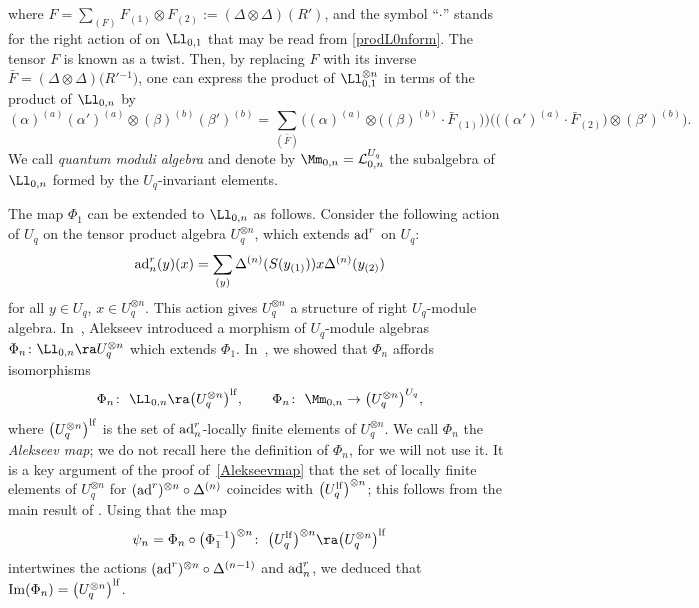 where $F=\sum_{(F)} F_{(1)}\otimes F_{(2)} := (\Delta \otimes \Delta)(R')$, and the symbol ``$\cdot$'' stands for the right action of  on $\Ll_{0,1}$ that may be read from \eqref{prodL0nform}. The tensor $F$ is known as a twist. Then, by replacing $F$ with its inverse $\bar{F} = (\Delta \otimes \Delta)\big(R'{}^{-1}\big)$, one can express the product of
$\Ll_{0,1}^{\otimes n}$ in terms of the product of $\Ll_{0,n}$ by
\begin{equation}\label{prodL0nform3}
(\alpha)^{(a)}(\alpha')^{(a)}\otimes (\beta)^{(b)}(\beta')^{(b)} = \sum_{(\bar{F})}\big((\alpha)^{(a)}\otimes
 \big((\beta)^{(b)}\cdot \bar{F}_{(1)}\big)\big) \big( \big((\alpha')^{(a)}\cdot \bar{F}_{(2)}\big)\otimes (\beta')^{(b)}\big).
\end{equation}
 We call {\it quantum moduli algebra} and denote by $\Mm_{0,n} = {\mathcal L}_{0,n}^{U_q}$ the subalgebra of $\Ll_{0,n}$ formed by the $U_q$-invariant elements.


The map $\Phi_1$ can be extended to $\Ll_{0,n}$ as follows. Consider the following action of $U_q$ on the tensor product algebra $U_q^{{\otimes} n}$, which extends ${\rm ad}^r$ on $U_q$:
\[%
{\rm ad}_n^r(y)(x) = \sum_{(y)}\Delta^{(n)}({S}(y_{(1)})) x \Delta^{(n)}(y_{(2)})
\]
for all $y \in U_q$, $x \in U_q^{{\otimes} n}$. This action gives $U_q^{{\otimes} n}$ a structure of right $U_q$-module algebra. In~\cite{A}, Alekseev introduced a morphism of $U_q$-module algebras $\Phi_n\colon \Ll_{0,n} \ra U_q^{\otimes n}$ which extends $\Phi_1$. In~\cite[Proposition~6.7]{BR}, we showed that $\Phi_n$ affords isomorphisms
\begin{equation}\label{Alekseevmap}
\Phi_n\colon\ \Ll_{0,n} \ra \big(U_q^{\otimes n}\big)^{\rm lf},\qquad \Phi_n\colon\ \Mm_{0,n}\rightarrow \big(U_q^{{\otimes} n}\big)^{U_q},
\end{equation}
where $\big(U_q^{\otimes n}\big)^{\rm lf}$ is the set of ${\rm ad}_n^r$-locally finite elements of $U_q^{{\otimes} n}$. We call $\Phi_n$ the {\it Alekseev map}; we do not recall here the definition of $\Phi_n$, for we will not use it. It is a key argument of the proof of~\eqref{Alekseevmap} that the set of locally finite elements of $U_q^{{\otimes} n}$ for $({\rm ad}^r)^{\otimes n}\circ \Delta^{(n)}$ coincides with $\big(U_q^{\rm lf}\big)^{\otimes n}$; this follows from the main result of \cite{KLNY}. Using that the map
\begin{equation}\label{Phipsi}
\psi_n = \Phi_n \circ \big(\Phi_1^{-1}\big)^{\otimes n}\colon\ \big(U_q^{\rm lf}\big)^{\otimes n}\ra \big(U_q^{\otimes n}\big)^{\rm lf}
\end{equation}
intertwines the actions $({\rm ad}^r)^{\otimes n}\circ \Delta^{(n-1)}$ and ${\rm ad}_n^r$, we deduced that ${\rm Im}(\Phi_n) = \big(U_q^{\otimes n}\big)^{\rm lf}$.

